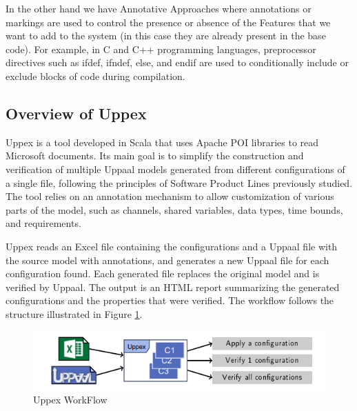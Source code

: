 In the other hand we have Annotative Approaches where annotations or markings are used to control the presence or absence of the Features that we want to add to the system (in this case they are already present in the base code). For example, in C and C++ programming languages, preprocessor directives such as ifdef, ifndef, else, and endif are used to conditionally include or exclude blocks of code during compilation.


\subsection*{Overview of Uppex}

Uppex is a tool developed in Scala that uses Apache POI libraries to read Microsoft documents. Its main goal is to simplify the construction and verification of multiple Uppaal models generated from different configurations of a single file, following the principles of Software Product Lines previously studied. The tool relies on an annotation mechanism to allow customization of various parts of the model, such as channels, shared variables, data types, time bounds, and requirements.

Uppex reads an Excel file containing the configurations and a Uppaal file with the source model with annotations, and generates a new Uppaal file for each configuration found. Each generated file replaces the original model and is verified by Uppaal. The output is an HTML report summarizing the generated configurations and the properties that were verified. The workflow follows the structure illustrated in Figure \ref{fig:Uppex WorkFlow}.

\begin{figure} [H]
    \centering
    \includegraphics[width=\linewidth]{images/uppex_flow.png}
    \caption{Uppex WorkFlow \cite{proenca_uppex}}
    \label{fig:Uppex WorkFlow}
\end{figure}

